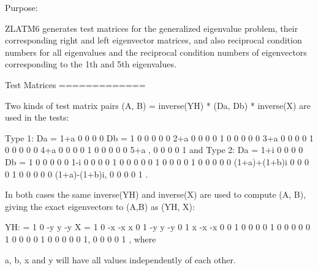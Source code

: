 \begin{DoxyParagraph}{Purpose\+: }
\begin{DoxyVerb} ZLATM6 generates test matrices for the generalized eigenvalue
 problem, their corresponding right and left eigenvector matrices,
 and also reciprocal condition numbers for all eigenvalues and
 the reciprocal condition numbers of eigenvectors corresponding to
 the 1th and 5th eigenvalues.

 Test Matrices
 =============

 Two kinds of test matrix pairs
          (A, B) = inverse(YH) * (Da, Db) * inverse(X)
 are used in the tests:

 Type 1:
    Da = 1+a   0    0    0    0    Db = 1   0   0   0   0
          0   2+a   0    0    0         0   1   0   0   0
          0    0   3+a   0    0         0   0   1   0   0
          0    0    0   4+a   0         0   0   0   1   0
          0    0    0    0   5+a ,      0   0   0   0   1
 and Type 2:
    Da = 1+i   0    0       0       0    Db = 1   0   0   0   0
          0   1-i   0       0       0         0   1   0   0   0
          0    0    1       0       0         0   0   1   0   0
          0    0    0 (1+a)+(1+b)i  0         0   0   0   1   0
          0    0    0       0 (1+a)-(1+b)i,   0   0   0   0   1 .

 In both cases the same inverse(YH) and inverse(X) are used to compute
 (A, B), giving the exact eigenvectors to (A,B) as (YH, X):

 YH:  =  1    0   -y    y   -y    X =  1   0  -x  -x   x
         0    1   -y    y   -y         0   1   x  -x  -x
         0    0    1    0    0         0   0   1   0   0
         0    0    0    1    0         0   0   0   1   0
         0    0    0    0    1,        0   0   0   0   1 , where

 a, b, x and y will have all values independently of each other.\end{DoxyVerb}
 
\end{DoxyParagraph}

